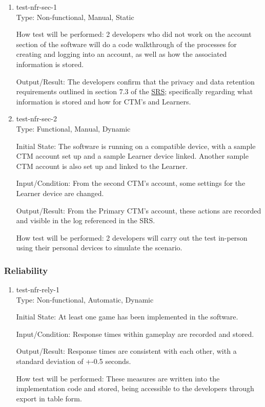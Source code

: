 \documentclass[12pt, titlepage]{article}
\begin{document}
\begin{enumerate}

\item\label{test-nfr-sec-1} test-nfr-sec-1\\

Type: Non-functional, Manual, Static
					
How test will be performed: 2 developers who did not work on the account section of the software will do a code walkthrough of the processes for creating and logging into an account, as well as how the associated information is stored.

Output/Result: The developers confirm that the privacy and data retention requirements outlined in section 7.3 of the \href{https://github.com/meena-alomran/game-n-grow/blob/main/pdfs/SRS-IEEE/SRS.pdf}{SRS}; specifically regarding what information is stored and how for CTM's and Learners.

\item\label{test-nfr-sec-2} test-nfr-sec-2\\

Type: Functional, Manual, Dynamic

Initial State: The software is running on a compatible device, with a sample CTM account set up and a sample Learner device linked. Another sample CTM account is also set up and linked to the Learner.
					
Input/Condition: From the second CTM's account, some settings for the Learner device are changed.

Output/Result: From the Primary CTM's account, these actions are recorded and visible in the log referenced in the SRS.
					
How test will be performed: 2 developers will carry out the test in-person using their personal devices to simulate the scenario.

\end{enumerate}

\subsubsection{Reliability}

\begin{enumerate}

\item\label{test-nfr-rely-1} test-nfr-rely-1\\

Type: Non-functional, Automatic, Dynamic

Initial State: At least one game has been implemented in the software.
					
Input/Condition: Response times within gameplay are recorded and stored.

Output/Result: Response times are consistent with each other, with a standard deviation of +-0.5 seconds.
					
How test will be performed: These measures are written into the implementation code and stored, being accessible to the developers through export in table form.

\end{enumerate}
\end{document}
